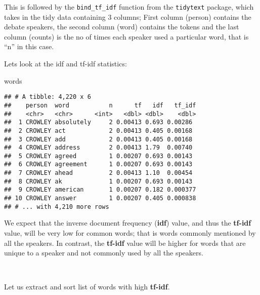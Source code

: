 \documentclass[
]{article}
\newenvironment{Shaded}{\begin{snugshade}}{\end{snugshade}}
\newcommand{\KeywordTok}[1]{\textcolor[rgb]{0.13,0.29,0.53}{\textbf{#1}}}
\newcommand{\NormalTok}[1]{#1}
\newcommand{\OperatorTok}[1]{\textcolor[rgb]{0.81,0.36,0.00}{\textbf{#1}}}
\newcommand{\StringTok}[1]{\textcolor[rgb]{0.31,0.60,0.02}{#1}}
\begin{document}
This is followed by the \texttt{bind\_tf\_idf} function from the
\texttt{tidytext} package, which takes in the tidy data containing 3
columns; First column (person) contains the debate speakers, the second
column (word) contains the tokens and the last column (counts) is the no
of times each speaker used a particular word, that is ``n'' in this
case.

\begin{Shaded}
\end{Shaded}

Lets look at the idf and tf-idf statistics:

\begin{Shaded}
\begin{Highlighting}[]
\NormalTok{words}
\end{Highlighting}
\end{Shaded}

\begin{verbatim}
## # A tibble: 4,220 x 6
##    person  word           n      tf   idf   tf_idf
##    <chr>   <chr>      <int>   <dbl> <dbl>    <dbl>
##  1 CROWLEY absolutely     2 0.00413 0.693 0.00286 
##  2 CROWLEY act            2 0.00413 0.405 0.00168 
##  3 CROWLEY add            2 0.00413 0.405 0.00168 
##  4 CROWLEY address        2 0.00413 1.79  0.00740 
##  5 CROWLEY agreed         1 0.00207 0.693 0.00143 
##  6 CROWLEY agreement      1 0.00207 0.693 0.00143 
##  7 CROWLEY ahead          2 0.00413 1.10  0.00454 
##  8 CROWLEY ak             1 0.00207 0.693 0.00143 
##  9 CROWLEY american       1 0.00207 0.182 0.000377
## 10 CROWLEY answer         1 0.00207 0.405 0.000838
## # ... with 4,210 more rows
\end{verbatim}

We expect that the inverse document frequency (\textbf{idf}) value, and
thus the \textbf{tf-idf} value, will be very low for common words; that
is words commonly mentioned by all the speakers. In contrast, the
\textbf{tf-idf} value will be higher for words that are unique to a
speaker and not commonly used by all the speakers.

~

Let us extract and sort list of words with high \textbf{tf-idf}.

\begin{Shaded}
\end{Shaded}
\end{document}
